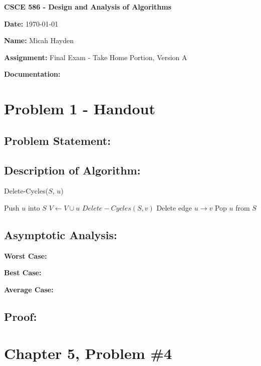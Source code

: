 \documentclass{article}
\begin{document}
\noindent \textbf{CSCE 586 - Design and Analysis of Algorithms}

\noindent \textbf{Date:}  \today 

\noindent \textbf{Name:}  Micah Hayden

\noindent \textbf{Assignment:}  Final Exam - Take Home Portion, Version A

\noindent \textbf{Documentation:} 

\hrulefill

\section*{Problem 1 - Handout}
\subsection*{Problem Statement:}  

\subsection*{Description of Algorithm:}

\begin{algorithm}
\caption{Delete-Cycles($S$, $u$) }
\begin{algorithmic}
\State Push $u$ into $S$
\State $V \gets V \cup u$ 
		\State $Delete-Cycles(S, v)$
		\State Delete edge $u \rightarrow v$	
	\EndIf
\EndFor
\State Pop $u$ from $S$
\State \Return
\end{algorithmic}
\end{algorithm}

\subsection*{Asymptotic Analysis:}
\noindent \textbf{Worst Case:}

\noindent \textbf{Best Case:}

\noindent \textbf{Average Case:}

\subsection*{Proof:}

\newpage

\section*{Chapter 5, Problem \#4}
\end{document}
